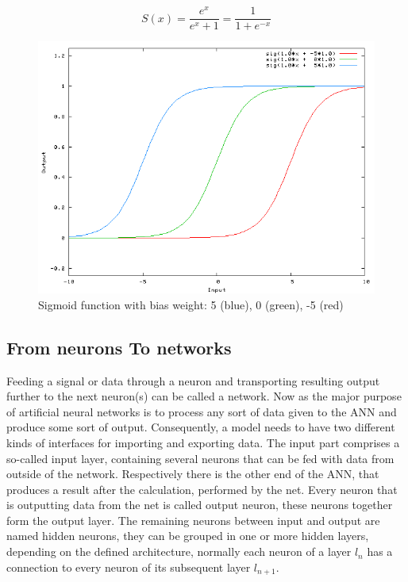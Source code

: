 \begin{equation}
\label{eqn:sigmoid}
S(x) = \frac{e^x}{e^x + 1} = \frac{1}{1 + e^{-x}}
\end{equation} 


\begin{figure}[H]
	\centering
	\includegraphics[width=\textwidth]{images/sigmoid.png}
	\caption{Sigmoid function with bias weight: 5 (blue), 0 (green), -5 (red){\cite{sigmoid}}}
	\label{fig:sigmoid}
	
\end{figure}


\subsection{From neurons To networks}
Feeding a signal or data through a neuron and transporting resulting output further to the next neuron(s) can be called a network. Now as the major purpose of artificial neural networks is to process any sort of data given to the ANN and produce some sort of output. Consequently, a model needs to have two different kinds of interfaces for importing and exporting data. \newline
The input part comprises a so-called input layer, containing several neurons that can be fed with data from outside of the network. Respectively there is the other end of the ANN, that produces a result after the calculation, performed by the net. Every neuron that is outputting data from the net is called output neuron, these neurons together form the output layer. The remaining neurons between input and output are named hidden neurons, they can be grouped in one or more hidden layers, depending on the defined architecture, normally each neuron of a layer $l_{n}$ has a connection to every neuron of its subsequent layer $l_{n+1}$.

